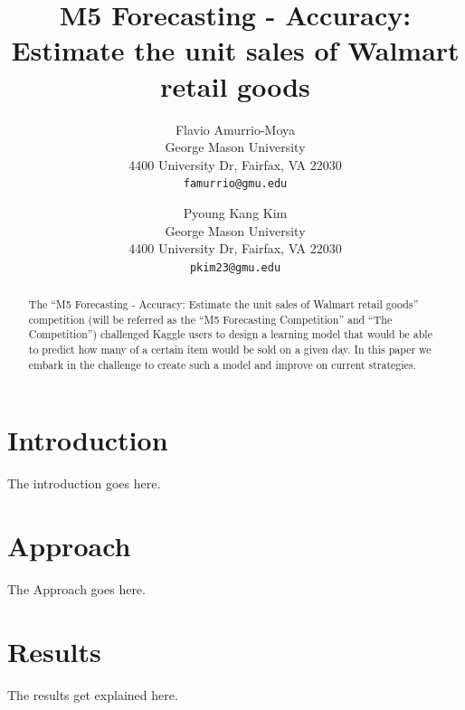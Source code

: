 \documentclass[10pt,twocolumn,letterpaper]{article}
\begin{document}
\title{M5 Forecasting - Accuracy: Estimate the unit sales of Walmart retail goods}

\author{Flavio Amurrio-Moya\\
George Mason University\\
4400 University Dr, Fairfax, VA 22030\\
{\tt\small famurrio@gmu.edu}
\and
Pyoung Kang Kim\\
George Mason University\\
4400 University Dr, Fairfax, VA 22030\\
{\tt\small pkim23@gmu.edu}
}

\maketitle
\thispagestyle{empty}

\begin{abstract}
   The ``M5 Forecasting - Accuracy: Estimate the unit sales of Walmart retail
   goods'' competition (will be referred as the ``M5 Forecasting Competition''
   and ``The Competition'') challenged Kaggle users to design a learning model
   that would be able to predict how many of a certain item would be sold
   on a given day. In this paper we embark in the challenge to create such a
   model and improve on current strategies.
\end{abstract}

\section{Introduction}

The introduction goes here.


\section{Approach}
The Approach goes here.

\section{Results}
The results get explained here.
\end{document}
